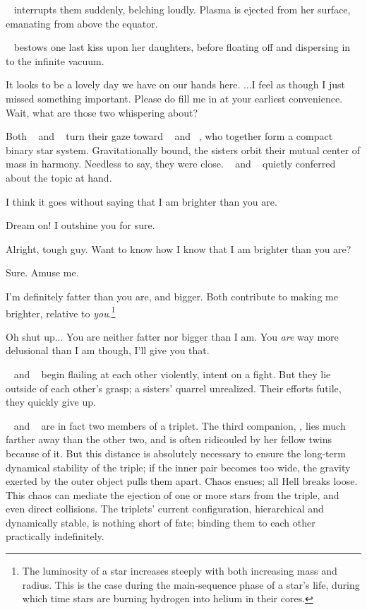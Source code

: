 \documentclass[main.tex]{subfiles}
\begin{document}
\newpara \nar \rmelectra~ interrupts them suddenly, belching loudly.  Plasma is ejected from her surface, emanating from above the equator.  

\newpara \nar \rmpleione~ bestows one last kiss upon her daughters, before floating off and dispersing in to the infinite vacuum.

\newpara \Electra It looks to be a lovely day we have on our hands here. ...I feel as though I just missed something important.  Please do fill me in at your earliest convenience.  Wait, what are those two whispering about?

\newpara \nar Both \rmmaia~ and \rmelectra~ turn their gaze toward \rmtaygete~ and \rmalcyone~, who together form a compact binary star system.  Gravitationally bound, the sisters orbit their mutual center of mass in harmony.  Needless to say, they were close.  \rmtaygete~ and \rmalcyone~ quietly conferred about the topic at hand.

\newpara \Taygete I think it goes without saying that I am brighter than you are.

\newpara \Alcyone Dream on!  I outshine you for sure.

\newpara \Taygete Alright, tough guy.  Want to know how I know that I am brighter than you are?

\newpara \Alcyone Sure.  Amuse me.

\newpara \Taygete I'm definitely fatter than you are, and bigger.  Both contribute to making me brighter, relative to \textit{you}.\footnote{The luminosity of a star increases steeply with both increasing mass and radius.  This is the case during the main-sequence phase of a star's life, during which time stars are burning hydrogen into helium in their cores.}  

\newpara \Alcyone Oh shut up...  You are neither fatter nor bigger than I am.  You \textit{are} way more delusional than I am though, I'll give you that.

\newpara \nar \rmtaygete~ and \rmalcyone~ begin flailing at each other violently, intent on a fight.  But they lie outside of each other's grasp; a sisters' quarrel unrealized.  Their efforts futile, they quickly give up.  

\newpara \nar \rmtaygete~ and \rmalcyone~ are in fact two members of a triplet.  The third companion, \rmcelaeno, lies much farther away than the other two, and is often ridicouled by her fellow twins because of it.  But this distance is absolutely necessary to ensure the long-term dynamical stability of the triple;  if the inner pair becomes too wide, the gravity exerted by the outer object pulls them apart.  Chaos ensues; all Hell breaks loose.  This chaos can mediate the ejection of one or more stars from the triple, and even direct collisions.  The triplets' current configuration, hierarchical and dynamically stable, is nothing short of fate; binding them to each other practically indefinitely.
\end{document}
